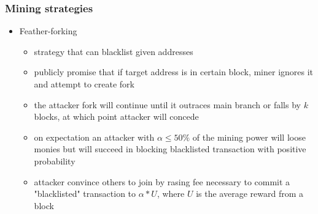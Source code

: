 \documentclass{beamer}
\begin{document}
\begin{frame}
    \frametitle{Mining strategies}
    \begin{itemize}
        \item<1-> Feather-forking
        \begin{itemize}
            \item<2-> strategy that can blacklist given addresses
            \item<3-> publicly promise that if target address is in certain block, miner ignores it and attempt to create fork
            \item<4-> the attacker fork will continue until it outraces main branch or falls by $k$ blocks, at which point attacker will concede
            \item<5-> on expectation an attacker with $\alpha \le 50\%$ of the mining power will loose monies but will succeed in blocking blacklisted transaction with positive probability
            \item<6-> attacker convince others to join by rasing fee necessary to commit a "blacklisted" transaction to $\alpha*U$, where $U$ is the average reward from a block
        \end{itemize}   
    \end{itemize}
\end{frame}
\end{document}

